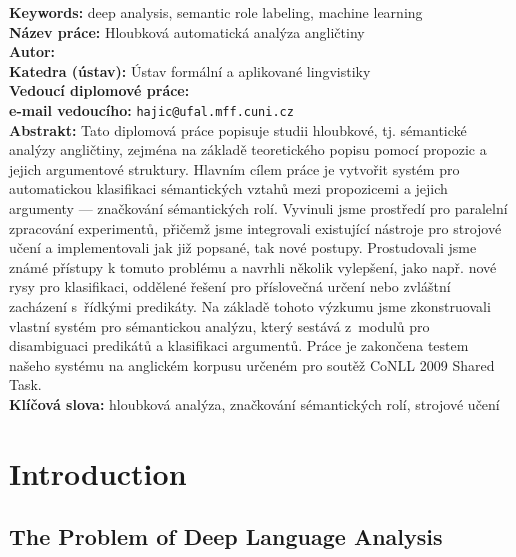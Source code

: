 \documentclass[12pt,notitlepage,a4paper]{report}
\begin{document}
\noindent \textbf{Keywords:} deep analysis, semantic role labeling, machine learning \\

\bigskip
{}
\noindent
\textbf{Název práce:} Hloubková automatická analýza angličtiny\\
\textbf{Autor:} \theauthor\\
\textbf{Katedra (ústav):} Ústav formální a aplikované lingvistiky\\
\textbf{Vedoucí diplomové práce:} \thesupervisor\\
\textbf{e-mail vedoucího:} \texttt{hajic@ufal.mff.cuni.cz}\\

\noindent \textbf{Abstrakt:} Tato diplomová práce popisuje studii hloubkové, tj. sémantické ana\-lýzy angličtiny, zejména na základě teoretického popisu pomocí propozic a jejich argumentové struktury. Hlavním cílem práce je vytvořit systém pro automa\-tic\-kou klasifikaci sémantických vztahů mezi propozicemi a jejich argumenty --- značkování sémantických rolí. Vyvinuli jsme prostředí pro paralelní zpracování experimentů, přičemž jsme integrovali existující nástroje pro strojové učení a implementovali jak již popsané, tak nové postupy. Prostudovali jsme známé pří\-stupy k tomuto problému a navrhli několik vylepšení, jako např. nové rysy pro klasifikaci, oddělené řešení pro příslovečná určení nebo zvláštní zacházení s~řídkými predikáty. Na základě tohoto výzkumu jsme zkonstruovali vlastní systém pro sémantickou analýzu, který sestává z~modulů pro disambiguaci predikátů a klasifikaci argumentů. Práce je zakončena testem našeho systému na anglickém korpusu určeném pro soutěž CoNLL 2009 Shared Task. \\

\noindent \textbf{Klíčová slova:} hloubková analýza, značkování sémantických rolí, strojové učení

\cleardoublepage

%
%
\chapter{Introduction}\label{intro}
%
%

\section{The Problem of Deep Language Analysis}\label{problem}
\end{document}
